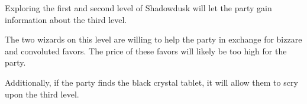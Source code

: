 Exploring the first and second level of Shadowdusk will let the party gain information about the third level.

The two wizards on this level are willing to help the party in exchange for bizzare and convoluted favors.
The price of these favors will likely be too high for the party.

Additionally, if the party finds the black crystal tablet, it will allow them to scry upon the third level.
